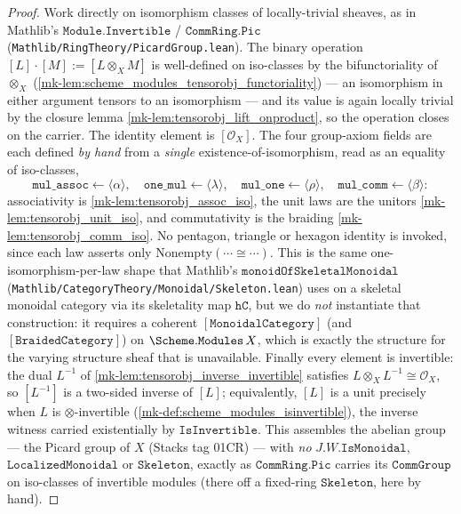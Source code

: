 \begin{proof}
  Work directly on isomorphism classes of locally-trivial sheaves, as in Mathlib's
  \(\mathtt{Module.Invertible}\) / \(\mathtt{CommRing.Pic}\)
  (\texttt{Mathlib/RingTheory/PicardGroup.lean}). The binary operation
  \([L]\cdot[M] := [L \otimes_X M]\) is well-defined on iso-classes by the
  bifunctoriality of \(\otimes_X\)
  (\ref{mk-lem:scheme_modules_tensorobj_functoriality}) --- an isomorphism in either
  argument tensors to an isomorphism --- and its value is again locally trivial by
  the closure lemma \ref{mk-lem:tensorobj_lift_onproduct}, so the operation closes on
  the carrier. The identity element is \([\mathcal{O}_X]\). The four group-axiom
  fields are each defined \emph{by hand} from a \emph{single} existence-of-isomorphism,
  read as an equality of iso-classes,
  \[
    \mathtt{mul\_assoc} \leftarrow \langle\alpha\rangle,
    \quad
    \mathtt{one\_mul} \leftarrow \langle\lambda\rangle,
    \quad
    \mathtt{mul\_one} \leftarrow \langle\rho\rangle,
    \quad
    \mathtt{mul\_comm} \leftarrow \langle\beta\rangle:
  \]
  associativity is \ref{mk-lem:tensorobj_assoc_iso}, the unit laws are the unitors
  \ref{mk-lem:tensorobj_unit_iso}, and commutativity is the braiding
  \ref{mk-lem:tensorobj_comm_iso}. No pentagon, triangle or hexagon identity is
  invoked, since each law asserts only \(\mathrm{Nonempty}(\cdots \cong \cdots)\).
  This is the same one-isomorphism-per-law shape that Mathlib's
  \(\mathtt{monoidOfSkeletalMonoidal}\)
  (\texttt{Mathlib/CategoryTheory/Monoidal/Skeleton.lean}) uses on a skeletal
  monoidal category via its skeletality map \(\mathtt{hC}\), but we do \emph{not}
  instantiate that construction: it requires a coherent \([\mathtt{MonoidalCategory}]\)
  (and \([\mathtt{BraidedCategory}]\)) on \(\Scheme.\mathtt{Modules}\,X\), which is
  exactly the structure for the varying structure sheaf that is unavailable.
  Finally every element is invertible: the dual \(L^{-1}\) of
  \ref{mk-lem:tensorobj_inverse_invertible} satisfies \(L \otimes_X L^{-1} \cong
  \mathcal{O}_X\), so \([L^{-1}]\) is a two-sided inverse of \([L]\); equivalently,
  \([L]\) is a unit precisely when \(L\) is \(\otimes\)-invertible
  (\ref{mk-def:scheme_modules_isinvertible}), the inverse witness carried
  existentially by \(\mathtt{IsInvertible}\). This assembles the abelian group ---
  the Picard group of \(X\) (Stacks tag 01CR) --- with \emph{no}
  \(J.W.\mathtt{IsMonoidal}\), \(\mathtt{LocalizedMonoidal}\) or \(\mathtt{Skeleton}\),
  exactly as \(\mathtt{CommRing.Pic}\) carries its \(\mathtt{CommGroup}\) on
  iso-classes of invertible modules (there off a fixed-ring \(\mathtt{Skeleton}\),
  here by hand).


\end{proof}
